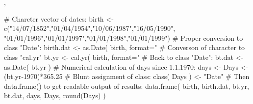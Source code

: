 \begin{SeeAlso}\relax
{},
\end{SeeAlso}
\begin{Examples}
\begin{ExampleCode}
 # Charcter vector of dates:
 birth <- c("14/07/1852","01/04/1954","10/06/1987","16/05/1990",
            "01/01/1996","01/01/1997","01/01/1998","01/01/1999")
 # Proper conversion to class "Date":
 birth.dat <- as.Date( birth, format="%
 # Converson of character to class "cal.yr"
 bt.yr <- cal.yr( birth, format="%
 # Back to class "Date":
 bt.dat <- as.Date( bt.yr )
 # Numerical calculation of days since 1.1.1970:
 days <- Days <- (bt.yr-1970)*365.25
 # Blunt assignment of class:
 class( Days ) <- "Date"
 # Then data.frame() to get readable output of results:
 data.frame( birth, birth.dat, bt.yr, bt.dat, days, Days, round(Days) )
\end{ExampleCode}
\end{Examples}

